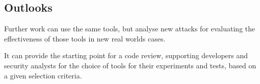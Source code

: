  

\subsection{Outlooks}
Further work can use the same tools, but analyse new attacks for evaluating the effectiveness of those tools in new real worlds cases.

It can provide the starting point for a code review, supporting developers 
and security analysts for the choice of tools for their experiments and tests, based on a
given selection criteria. 

